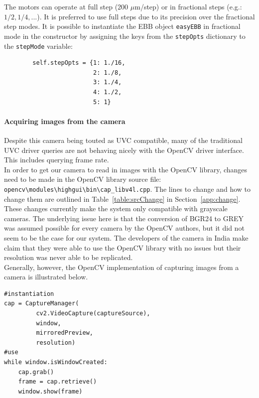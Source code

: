 \documentclass[main.tex]{subfiles}
\begin{document}
 The motors can operate at full step (200 $\mu$m/step) or in fractional steps (e.g.: $1/2, 1/4, ...$). It is preferred to use full steps due to its precision over the fractional step modes. It is possible to instantiate the EBB object \verb|easyEBB| in fractional mode in the constructor by assigning the keys from the \verb|stepOpts| dictionary to the \verb|stepMode| variable:
\begin{verbatim}
        self.stepOpts = {1: 1./16, 
                         2: 1./8, 
                         3: 1./4, 
                         4: 1./2, 
                         5: 1}
\end{verbatim}




\paragraph{Acquiring images from the camera}
\label{p:Camera}
Despite this camera being touted as UVC compatible, many of the traditional UVC driver queries are not behaving nicely with the OpenCV driver interface. This includes querying frame rate.\\

In order to get our camera to read in images with the OpenCV library, changes need to be made in the OpenCV library source file: \verb|opencv\modules\highgui\bin\cap_libv4l.cpp|. The lines to change and how to change them are outlined in Table~\ref{table:srcChange} in Section~\ref{app:change}. These changes currently make the system only compatible with grayscale cameras. The underlying issue here is that the conversion of BGR24 to GREY was assumed possible for every camera by the OpenCV authors, but it did not seem to be the case for our system. The developers of the camera in India make claim that they were able to use the OpenCV library with no issues but their resolution was never able to be replicated.\\

Generally, however, the OpenCV implementation of capturing images from a camera is illustrated below. \\
\begin{lstlisting} 
#instantiation
cap = CaptureManager( 
         cv2.VideoCapture(captureSource), 
         window, 
         mirroredPreview, 
         resolution)
#use
while window.isWindowCreated:
    cap.grab()
    frame = cap.retrieve()
    window.show(frame)
\end{lstlisting}
\end{document}
